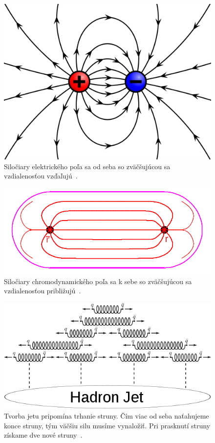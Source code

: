 \documentclass[thesismargins, thesislinespacing]{rnthesis}
\begin{document}
\begin{figure}[hbtp!]
	\centering
	\includegraphics[scale=0.08]{./Obrazky_praca/el_pole.png}
	\caption{Siločiary elektrického poľa sa od seba so zväčšujúcou sa vzdialenosťou vzďaľujú~\cite{6}.}
	\label{elpole}
\end{figure}
\begin{figure}[hbtp!]
	\centering
	\includegraphics[scale=0.25]{./Obrazky_praca/chromo_pole.png}
	\caption {Siločiary chromodynamického poľa sa k sebe so zväčšujúcou sa vzdialenosťou približujú~\cite{7}.}
	\label{chrompole}
\end{figure}

\begin{figure}[hbtp!]
	\begin{center}
	\includegraphics[scale=0.5]{./Obrazky_praca/jet.png}
	\caption{Tvorba jetu pripomína trhanie struny. Čím viac od seba naťahujeme konce struny, tým väčšiu silu musíme vynaložiť. Pri prasknutí struny získame dve nové struny~\cite{8}.}
	\label{jet}
	\end{center}
\end{figure}  
\end{document}
